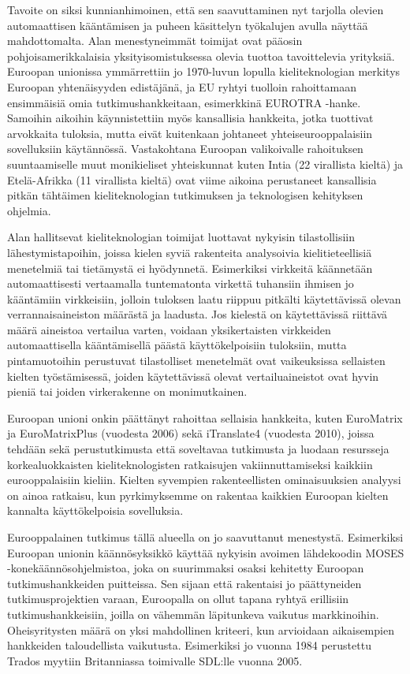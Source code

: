 \documentclass[]{../../metanetpaper}
\begin{document}
\begin{multicols}{2}

Tavoite on siksi kunnianhimoinen, että sen saavuttaminen nyt tarjolla olevien
automaattisen kääntämisen ja puheen käsittelyn työkalujen avulla näyttää
mahdottomalta. Alan menestyneimmät toimijat ovat pääosin pohjoisamerikkalaisia
yksityisomistuksessa olevia tuottoa tavoittelevia yrityksiä. Euroopan unionissa
ymmärrettiin jo 1970-luvun lopulla kieliteknologian merkitys Euroopan
yhtenäisyyden edistäjänä, ja EU ryhtyi tuolloin rahoittamaan ensimmäisiä omia
tutkimushankkeitaan, esimerkkinä EUROTRA -hanke. Samoihin aikoihin
käynnistettiin myös kansallisia hankkeita, jotka tuottivat arvokkaita tuloksia,
mutta eivät kuitenkaan johtaneet yhteiseurooppalaisiin sovelluksiin
käytännössä. Vastakohtana Euroopan valikoivalle rahoituksen suuntaamiselle muut
monikieliset yhteiskunnat kuten Intia (22 virallista kieltä) ja Etelä-Afrikka
(11 virallista kieltä) ovat viime aikoina perustaneet kansallisia pitkän
tähtäimen kieliteknologian tutkimuksen ja teknologisen kehityksen ohjelmia.

Alan hallitsevat kieliteknologian toimijat luottavat nykyisin tilastollisiin
lähestymistapoihin, joissa kielen syviä rakenteita analysoivia
kielitieteellisiä menetelmiä tai tietämystä ei hyödynnetä. Esimerkiksi
virkkeitä käännetään automaattisesti vertaamalla tuntematonta virkettä
tuhansiin ihmisen jo kääntämiin virkkeisiin, jolloin tuloksen laatu riippuu
pitkälti käytettävissä olevan verrannaisaineiston määrästä ja laadusta. Jos
kielestä on käytettävissä riittävä määrä aineistoa vertailua varten, voidaan
yksikertaisten virkkeiden automaattisella kääntämisellä päästä käyttökelpoisiin
tuloksiin, mutta pintamuotoihin perustuvat tilastolliset menetelmät ovat
vaikeuksissa sellaisten kielten työstämisessä, joiden käytettävissä olevat
vertailuaineistot ovat hyvin pieniä tai joiden virkerakenne on monimutkainen.

Euroopan unioni onkin päättänyt rahoittaa sellaisia hankkeita, kuten EuroMatrix
ja EuroMatrixPlus (vuodesta 2006) sekä iTranslate4 (vuodesta 2010), joissa
tehdään sekä perustutkimusta että soveltavaa tutkimusta ja luodaan resursseja
korkealuokkaisten kieliteknologisten ratkaisujen vakiinnuttamiseksi kaikkiin
eurooppalaisiin kieliin. Kielten syvempien rakenteellisten ominaisuuksien
analyysi on ainoa ratkaisu, kun pyrkimyksemme on rakentaa kaikkien Euroopan
kielten kannalta käyttökelpoisia sovelluksia.

Eurooppalainen tutkimus tällä alueella on jo saavuttanut menestystä.
Esimerkiksi Euroopan unionin käännösyksikkö käyttää nykyisin avoimen
lähdekoodin MOSES -konekäännösohjelmistoa, joka on suurimmaksi osaksi kehitetty
Euroopan tutkimushankkeiden puitteissa. Sen sijaan että rakentaisi jo
päättyneiden tutkimusprojektien varaan, Euroopalla on ollut tapana ryhtyä
erillisiin tutkimushankkeisiin, joilla on vähemmän läpitunkeva vaikutus
markkinoihin. Oheisyritysten määrä on yksi mahdollinen kriteeri, kun arvioidaan
aikaisempien hankkeiden taloudellista vaikutusta. Esimerkiksi jo vuonna 1984
perustettu Trados myytiin Britanniassa toimivalle SDL:lle vuonna 2005.


\end{multicols}
\end{document}
